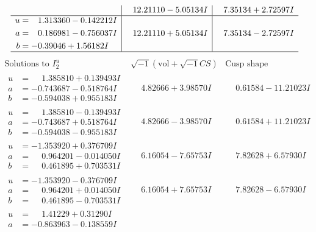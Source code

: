 \documentclass[1p]{elsarticle_modified}
\theoremstyle{definition}
\newcommand{\I}{\sqrt{-1}}
\begin{document}
$$\begin{array}{c|c|c}
 & \phantom{-}12.21110 - 5.05134 I & \phantom{-}7.35134 + 2.72597 I \\ \hline\begin{aligned}
u &= \phantom{-}1.313360 - 0.142212 I \\
a &= \phantom{-}0.186981 - 0.756037 I \\
b &= -0.39046 + 1.56182 I\end{aligned}
 & \phantom{-}12.21110 + 5.05134 I & \phantom{-}7.35134 - 2.72597 I\\
 \hline 
 \end{array}$$\newpage$$\begin{array}{c|c|c}  
\text{Solutions to }I^u_{2}& \I (\text{vol} + \sqrt{-1}CS) & \text{Cusp shape}\\
 \hline 
\begin{aligned}
u &= \phantom{-}1.385810 + 0.139493 I \\
a &= -0.743687 - 0.518764 I \\
b &= -0.594038 + 0.955183 I\end{aligned}
 & \phantom{-}4.82666 + 3.98570 I & \phantom{-}0.61584 - 11.21023 I \\ \hline\begin{aligned}
u &= \phantom{-}1.385810 - 0.139493 I \\
a &= -0.743687 + 0.518764 I \\
b &= -0.594038 - 0.955183 I\end{aligned}
 & \phantom{-}4.82666 - 3.98570 I & \phantom{-}0.61584 + 11.21023 I \\ \hline\begin{aligned}
u &= -1.353920 + 0.376709 I \\
a &= \phantom{-}0.964201 - 0.014050 I \\
b &= \phantom{-}0.461895 + 0.703531 I\end{aligned}
 & \phantom{-}6.16054 - 7.65753 I & \phantom{-}7.82628 + 6.57930 I \\ \hline\begin{aligned}
u &= -1.353920 - 0.376709 I \\
a &= \phantom{-}0.964201 + 0.014050 I \\
b &= \phantom{-}0.461895 - 0.703531 I\end{aligned}
 & \phantom{-}6.16054 + 7.65753 I & \phantom{-}7.82628 - 6.57930 I \\ \hline\begin{aligned}
u &= \phantom{-}1.41229 + 0.31290 I \\
a &= -0.863963 - 0.138559 I \\

\end{aligned}
\end{array}$$
\end{document}
